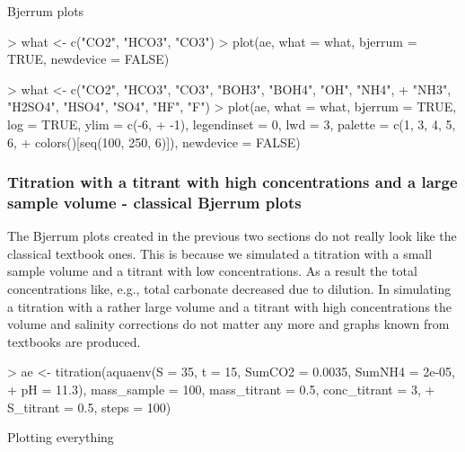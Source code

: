\documentclass[article,nojss]{jss}
\begin{document}
Bjerrum plots
\begin{Schunk}
\begin{Sinput}
> what <- c("CO2", "HCO3", "CO3")
> plot(ae, what = what, bjerrum = TRUE, newdevice = FALSE)
\end{Sinput}
\end{Schunk}

\begin{Schunk}
\begin{Sinput}
> what <- c("CO2", "HCO3", "CO3", "BOH3", "BOH4", "OH", "NH4", 
+     "NH3", "H2SO4", "HSO4", "SO4", "HF", "F")
> plot(ae, what = what, bjerrum = TRUE, log = TRUE, ylim = c(-6, 
+     -1), legendinset = 0, lwd = 3, palette = c(1, 3, 4, 5, 6, 
+     colors()[seq(100, 250, 6)]), newdevice = FALSE)
\end{Sinput}
\end{Schunk}


\subsubsection{Titration with a titrant with high concentrations and a large sample volume - classical Bjerrum plots}
The Bjerrum plots created in the previous two sections do not really look like the classical textbook ones.
This is because we simulated a titration with a small sample volume and a titrant with low concentrations. 
As a result the total concentrations like, e.g., total carbonate decreased due to dilution. 
In simulating a titration with a rather large volume and a titrant with high concentrations the volume and salinity corrections do not matter
any more and graphs known from textbooks \citep[e.g.][]{Zeebe2001} are produced.

\begin{Schunk}
\begin{Sinput}
> ae <- titration(aquaenv(S = 35, t = 15, SumCO2 = 0.0035, SumNH4 = 2e-05, 
+     pH = 11.3), mass_sample = 100, mass_titrant = 0.5, conc_titrant = 3, 
+     S_titrant = 0.5, steps = 100)
\end{Sinput}
\end{Schunk}

Plotting everything
\begin{Schunk}
\end{Schunk}
\end{document}
